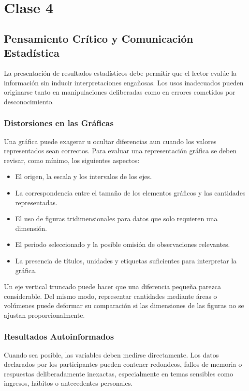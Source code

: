 \chapter{Clase 4}

\section{Pensamiento Crítico y Comunicación Estadística}

La presentación de resultados estadísticos debe permitir que el lector evalúe la información sin inducir interpretaciones engañosas. Los usos inadecuados pueden originarse tanto en manipulaciones deliberadas como en errores cometidos por desconocimiento.

\subsection{Distorsiones en las Gráficas}

Una gráfica puede exagerar u ocultar diferencias aun cuando los valores representados sean correctos. Para evaluar una representación gráfica se deben revisar, como mínimo, los siguientes aspectos:

\begin{itemize}
    \item El origen, la escala y los intervalos de los ejes.
    \item La correspondencia entre el tamaño de los elementos gráficos y las cantidades representadas.
    \item El uso de figuras tridimensionales para datos que solo requieren una dimensión.
    \item El periodo seleccionado y la posible omisión de observaciones relevantes.
    \item La presencia de títulos, unidades y etiquetas suficientes para interpretar la gráfica.
\end{itemize}

Un eje vertical truncado puede hacer que una diferencia pequeña parezca considerable. Del mismo modo, representar cantidades mediante áreas o volúmenes puede deformar su comparación si las dimensiones de las figuras no se ajustan proporcionalmente.

\subsection{Resultados Autoinformados}

Cuando sea posible, las variables deben medirse directamente. Los datos declarados por los participantes pueden contener redondeos, fallos de memoria o respuestas deliberadamente inexactas, especialmente en temas sensibles como ingresos, hábitos o antecedentes personales.

